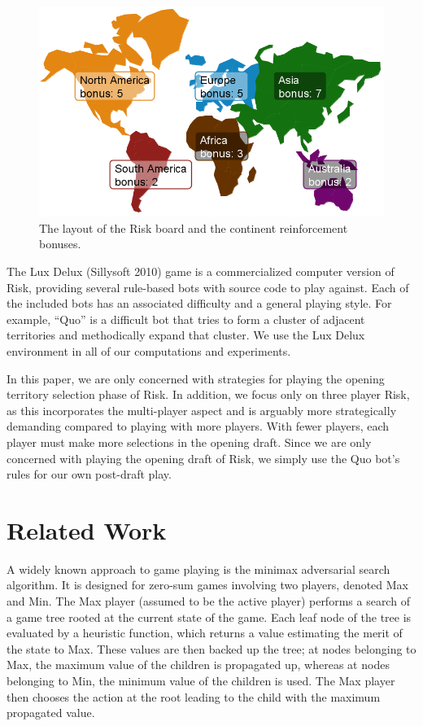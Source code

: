 \documentclass[letterpaper]{article}
\numberwithin{equation}{section}
\numberwithin{theorem}{section}
\numberwithin{lemma}{section}
\numberwithin{df}{section}
\begin{document}
\begin{figure}[t]
	\centering
	\includegraphics[scale=0.325]{../ForPublication/figs/Conts.png}
	\caption{The layout of the Risk board and the continent reinforcement bonuses.}
	\label{fig:Conts}
\end{figure}

The Lux Delux (Sillysoft 2010) \nocite{Lux} %
game is a commercialized computer version of Risk, providing several rule-based bots with source code to play against.  Each of the included bots has an associated difficulty and a general playing style.  For example, ``Quo'' is a difficult bot that tries to form a cluster of adjacent territories and methodically expand that cluster.  We use the Lux Delux environment in all of our computations and experiments.  

In this paper, we are only concerned with strategies for playing the opening territory selection phase of Risk.  In addition, we focus only on three player Risk, as this incorporates the multi-player aspect and is arguably more strategically demanding compared to playing with more players.  With fewer players, each player must make more selections in the opening draft.  Since we are only concerned with playing the opening draft of Risk, we simply use the Quo bot's rules for our own post-draft play. 

\section{Related Work}

A widely known approach to game playing is the minimax adversarial search algorithm.  It is designed for zero-sum games involving two players, denoted Max and Min.  The Max player (assumed to be the active player) performs a search of a game tree rooted at the current state of the game.  Each leaf node of the tree is evaluated by a heuristic function, which returns a value estimating the merit of the state to Max.  These values are then backed up the tree; at nodes belonging to Max, the maximum value of the children is propagated up, whereas at nodes belonging to Min, the minimum value of the children is used.  The Max player then chooses the action at the root leading to the child with the maximum propagated value.
\end{document}
